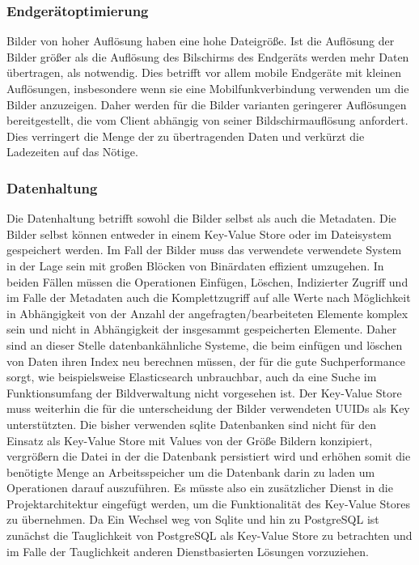 
\subsubsection{Endgerätoptimierung}

Bilder von hoher Auflösung haben eine hohe Dateigröße. Ist die Auflösung der
Bilder größer als die Auflösung des Bilschirms des Endgeräts werden mehr Daten
übertragen, als notwendig. Dies betrifft vor allem mobile Endgeräte mit
kleinen Auflösungen, insbesondere wenn sie eine Mobilfunkverbindung verwenden um
die Bilder anzuzeigen. Daher werden für die Bilder varianten geringerer
Auflösungen bereitgestellt, die vom Client abhängig von seiner
Bildschirmauflösung anfordert. Dies verringert die Menge der zu übertragenden
Daten und verkürzt die Ladezeiten auf das Nötige.


\subsubsection{Datenhaltung}

Die Datenhaltung betrifft sowohl die Bilder selbst als auch die Metadaten. Die
Bilder selbst können entweder in einem Key-Value Store oder im Dateisystem
gespeichert werden. Im Fall der Bilder muss das verwendete verwendete System in
der Lage sein mit großen Blöcken von Binärdaten effizient umzugehen. In
beiden Fällen müssen die Operationen Einfügen, Löschen, Indizierter Zugriff und
im Falle der Metadaten auch die Komplettzugriff auf alle Werte nach Möglichkeit
in Abhängigkeit von der Anzahl der angefragten/bearbeiteten Elemente komplex
sein und nicht in Abhängigkeit der insgesammt gespeicherten Elemente. Daher sind
an dieser Stelle datenbankähnliche Systeme, die beim einfügen und löschen von
Daten ihren Index neu berechnen müssen, der für die gute Suchperformance sorgt,
wie beispielsweise Elasticsearch unbrauchbar, auch da eine Suche im
Funktionsumfang der Bildverwaltung nicht vorgesehen ist. Der Key-Value Store
muss weiterhin die für die unterscheidung der Bilder verwendeten UUIDs als Key
unterstützten. Die bisher verwenden sqlite Datenbanken sind nicht für den
Einsatz als Key-Value Store mit Values von der Größe Bildern konzipiert,
vergrößern die Datei in der die Datenbank persistiert wird und erhöhen somit die
benötigte Menge an Arbeitsspeicher um die Datenbank darin zu laden um
Operationen darauf auszuführen. Es müsste also ein zusätzlicher Dienst in die
Projektarchitektur eingefügt werden, um die Funktionalität des Key-Value Stores
zu übernehmen. Da Ein Wechsel weg von Sqlite und hin zu PostgreSQL ist zunächst
die Tauglichkeit von PostgreSQL als Key-Value Store zu betrachten und im Falle
der Tauglichkeit anderen Dienstbasierten Lösungen vorzuziehen.

